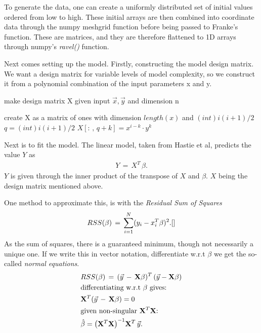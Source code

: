 \documentclass[ 12pt, a4paper ]{article}
\begin{document}
To generate the data, one can create a uniformly distributed set of initial values ordered 
from low to high. These initial arrays are then combined into coordinate data through the 
numpy meshgrid function before being passed to Franke's function. These are matrices, and 
they are therefore flattened to 1D arrays through numpy's \textit{ravel()} function.

Next comes setting up the model. Firstly, constructing the model design matrix. We want a
design matrix for variable levels of model complexity, so we construct it from a polynomial
combination of the input parameters x and y. 
\begin{algorithm}
\caption{make design matrix X given input $\vec{x}, \vec{y}$ and dimension n}
\begin{algorithmic}
\STATE  create X as a matrix of ones with dimension $length(x)$ and $(int) i(i+1)/2$
\STATE $q = (int) i(i+1)/2$
\STATE $X[:\,,\,q+k] = x^{i - k} \cdot y^k $
\ENDFOR
\ENDFOR
\end{algorithmic}
\label{alg:design}
\end{algorithm}

Next is to fit the model. The linear model, taken from Hastie et al\cite{}, predicts the 
value $Y$ as 
\begin{align}
    Y \,=\, X^T \, \beta.
\end{align}
$Y$ is given through the inner product of the transpose of $X$ and $\beta$.
$X$ being the design matrix mentioned above. 

One method to approximate this, is with the \textit{Residual Sum of Squares}
\begin{align}
    RSS(\beta) \,=\, \sum_{i=1}^N (y_i - x_i^T\beta)^2.\cite{}
\end{align}
As the sum of squares, there is a guaranteed minimum, though not necessarily a unique one. 
If we write this in vector notation, differentiate w.r.t $\beta$ we get the so-called 
\textit{normal equations}. 
\begin{align}
    &RSS(\beta) \,=\, ( \vec{y} \,-\, \mathbf{X}\beta )^T \, ( \vec{y} - \mathbf{X}\beta )
    \nonumber \\
    &\text{differentiating w.r.t $\beta$ gives:} \nonumber \\
    &    \mathbf{X}^T(\vec{y} \,-\, \mathbf{X}\beta) = 0 \nonumber \\
    &\text{given non-singular $\mathbf{X}^T\mathbf{X}$:} \nonumber \\
    & \hat{\beta} = \qty(\mathbf{X}^T\mathbf{X})^{-1}\mathbf{X}^T\,\vec{y}.
    \label{eq:minbeta}
\end{align}
\end{document}
